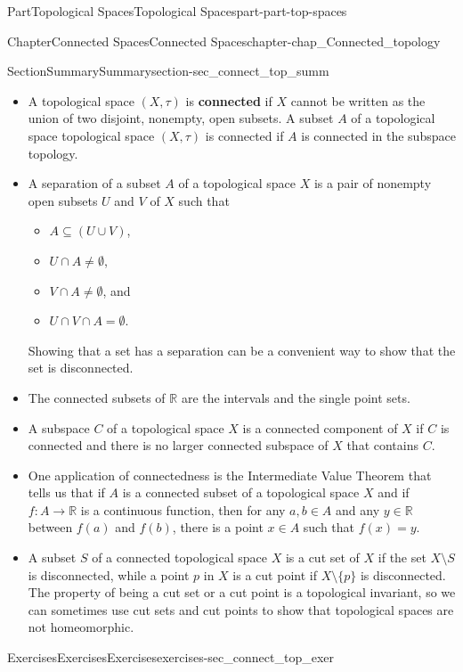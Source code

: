 \documentclass[oneside,10pt,]{book}
\newcommand{\terminology}[1]{\textbf{#1}}
\numberwithin{equation}{chapter}
\newcommand{\R}{\mathbb{R}}
\begin{document}
\begin{partptx}{Part}{Topological Spaces}{}{Topological Spaces}{}{}{part-part-top-spaces}
\begin{chapterptx}{Chapter}{Connected Spaces}{}{Connected Spaces}{}{}{chapter-chap_Connected_topology}
\begin{sectionptx}{Section}{Summary}{}{Summary}{}{}{section-sec_connect_top_summ}
\begin{itemize}[label=\textbullet]
\item{}A topological space \((X,\tau)\) is \terminology{connected}  if \(X\) cannot be written as the union of two disjoint, nonempty, open subsets. A subset \(A\) of a topological space topological space \((X,\tau)\) is connected if \(A\) is connected in the subspace topology.%
\item{}A separation of a subset \(A\) of a topological space \(X\) is a pair of nonempty open subsets \(U\) and \(V\) of \(X\) such that%
\begin{itemize}[label=$\circ$]
\item{}\(A \subseteq (U \cup V)\),%
\item{}\(U \cap A \neq \emptyset\),%
\item{}\(V \cap A \neq \emptyset\), and%
\item{}\(U \cap V \cap A = \emptyset\).%
\end{itemize}
Showing that a set has a separation can be a convenient way to show that the set is disconnected.%
\item{}The connected subsets of \(\R\) are the intervals and the single point sets.%
\item{}A subspace \(C\) of a topological space \(X\) is a connected component of \(X\) if \(C\) is connected and there is no larger connected subspace of \(X\) that contains \(C\).%
\item{}One application of connectedness is the Intermediate Value Theorem that tells us that if \(A\) is a connected subset of a topological space \(X\) and if \(f : A \to \R\) is a continuous function, then for any \(a,b \in A\) and any \(y \in \R\) between \(f(a)\) and \(f(b)\), there is a point \(x \in A\) such that \(f(x) = y\).%
\item{}A subset \(S\) of a connected topological space \(X\) is a cut set of \(X\) if the set \(X \setminus S\) is disconnected, while a point \(p\) in \(X\) is a cut point if \(X \setminus \{p\}\) is disconnected. The property of being a cut set or a cut point is a topological invariant, so we can sometimes use cut sets and cut points to show that topological spaces are not homeomorphic.%
\end{itemize}
%
\end{sectionptx}
%
%
\typeout{************************************************}
\typeout{************************************************}
%
\begin{exercises-section}{Exercises}{Exercises}{}{Exercises}{}{}{exercises-sec_connect_top_exer}

\end{exercises-section}
\end{chapterptx}
\end{partptx}
\end{document}
